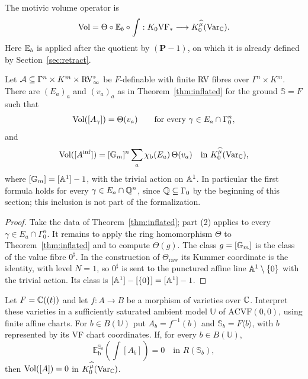 \begin{nota}\label{mov:vol}
The motivic volume operator is
\[
 \operatorname{Vol}=\Theta\circ\mathbb E_b\circ\int:
 K_0\mathrm{VF}_*\longrightarrow K_0^{\widehat\mu}(\mathrm{Var}_{\mathbb C}) .
\]
Here $\mathbb E_b$ is applied after the quotient by $(\bm P-1)$,
on which it is already defined by Section~\ref{sec:retract}.
\end{nota}

\begin{cor}\label{cor:inflated:vol}
Let $\mathcal A\subseteq\Gamma^n\times K^m\times\mathrm{RV}_\infty^s$ be
$F$-definable with finite RV fibres over $\Gamma^n\times K^m$. There are
$(E_a)_a$ and $(v_a)_a$ as in Theorem~\ref{thm:inflated} for the ground
$\mathbb S=F$ such that
\[
 \operatorname{Vol}([A_\gamma])=\Theta(v_a)\qquad\text{for every }\gamma\in E_a\cap\Gamma_0^n,
\]
and
\[
 \operatorname{Vol}([A^{\mathrm{inf}}])
   =[\mathbb G_m]^n\sum_a\chi_{\mathrm b}(E_a)\,\Theta(v_a)
   \quad\text{in }K_0^{\widehat\mu}(\mathrm{Var}_{\mathbb C}),
\]
where $[\mathbb G_m]=[\mathbb A^1]-1$, with the trivial action on $\mathbb A^1$.
In particular the first formula holds for every $\gamma\in E_a\cap\mathbb Q^n$,
since $\mathbb Q\subseteq\Gamma_0$ by the beginning of this section; this
inclusion is not part of the formalization.
\end{cor}

\begin{proof}
Take the data of Theorem~\ref{thm:inflated}; part (2) applies to every
$\gamma\in E_a\cap\Gamma_0^n$. It remains to apply the ring homomorphism $\Theta$ to
Theorem~\ref{thm:inflated} and to compute $\Theta(g)$. The class
$g=[\mathbb G_m]$ is the class of the value fibre $0^\sharp$. In the construction
of $\Theta_{\mathrm{raw}}$ its Kummer coordinate is the identity, with level
$N=1$, so $0^\sharp$ is sent to the punctured affine line
$\mathbb A^1\setminus\{0\}$ with the trivial action. Its class is
$[\mathbb A^1]-[\{0\}]=[\mathbb A^1]-1$.
\end{proof}

\begin{cor}\label{cor:global:vanishing}
Let $F=\mathbb C((t))$ and let $f:A\to B$ be a morphism of
varieties over $\mathbb C$.
Interpret these varieties in a sufficiently saturated
ambient model $\mathbb U$ of $\mathrm{ACVF}(0,0)$, using
finite affine charts.
For $b\in B(\mathbb U)$ put $A_b=f^{-1}(b)$ and
$\mathbb S_b=F\langle b\rangle$, with $b$ represented by its
VF chart coordinates.
If, for every $b\in B(\mathbb U)$,
\[
 \mathbb E_{\mathrm b}^{\mathbb S_b}\!
       \left(\int[A_b]\right)=0
       \quad\text{in }R(\mathbb S_b),
\]
then $\operatorname{Vol}([A])=0$ in $K_0^{\widehat\mu}(\mathrm{Var}_{\mathbb C})$.
\end{cor}

